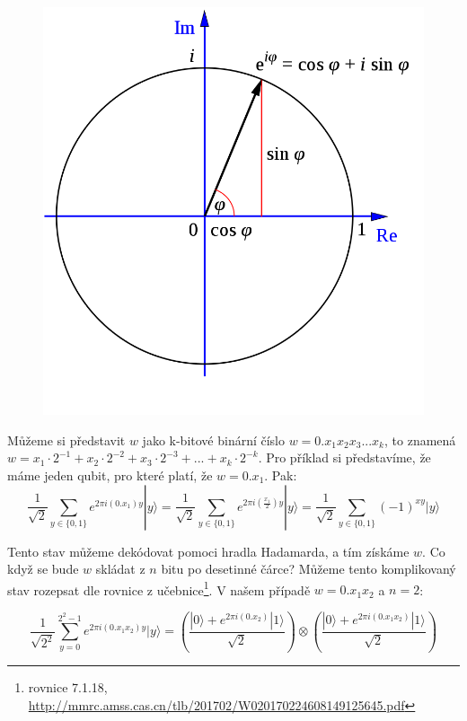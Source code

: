 \documentclass[11pt]{article}
\begin{document}
\begin{figure}[H]
    \includegraphics[scale=.25]{Eulers_formula.png}
    \centering
\end{figure}
\par Můžeme si představit $w$ jako k-bitové binární číslo $w=0.x_1x_2x_3...x_k$, to znamená $w = x_1 \cdot 2^{-1} + x_2 \cdot 2^{-2} + x_3 \cdot 2^{-3} + ... + x_k \cdot 2^{-k}$.
Pro příklad si představíme, že máme jeden qubit, pro které platí, že $w=0.x_1$.
Pak:
$$
    \frac{1}{\sqrt{2}}\displaystyle\sum_{y\in\{0, 1\}} e^{2\pi i (0.x_1) y}|y\rangle =
    \frac{1}{\sqrt{2}}\displaystyle\sum_{y\in\{0, 1\}} e^{2\pi i (\frac{x_1}{2}) y}|y\rangle =
    \frac{1}{\sqrt{2}}\displaystyle\sum_{y\in\{0, 1\}} (-1)^{xy}|y\rangle
$$
\par Tento stav můžeme dekódovat pomoci hradla Hadamarda, a tím získáme $w$.
Co když se bude $w$ skládat z $n$ bitu po desetinné čárce?
Můžeme tento komplikovaný stav rozepsat dle rovnice z učebnice\footnote{rovnice 7.1.18, \url{http://mmrc.amss.cas.cn/tlb/201702/W020170224608149125645.pdf}}.
V našem případě $w=0.x_1x_2$ a $n=2$:

$$
    \frac{1}{\sqrt{2^2}}\displaystyle\sum_{y=0}^{2^2 - 1} e^{2\pi i (0.x_1x_2) y}|y\rangle =
    \left(\frac{|0\rangle + e^{2\pi i (0.x_2)}|1\rangle}{\sqrt{2}}\right) \otimes
    \left(\frac{|0\rangle + e^{2\pi i (0.x_1x_2)}|1\rangle}{\sqrt{2}}\right)
$$
\end{document}
